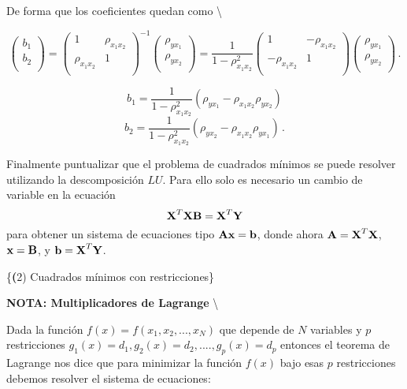 \documentclass[
]{agujournal2019}
\begin{document}
De forma que los coeficientes quedan como \textbackslash{}

\[\left(\begin{array}{c}
  b_1 \\
  b_2 \\
        \end{array}\right)=\left(\begin{array}{cc}
  1 & \rho_{x_{1} x_{2}} \\
  \rho_{x_{1} x_{2}} & 1 \\
        \end{array}\right)^{-1}
     \left(\begin{array}{c}
  \rho_{y x_{1}} \\
  \rho_{y x_{2}} \\
        \end{array}\right)=\frac{1}{1-\rho^2_{x_{1} x_{2}}}
    \left(\begin{array}{cc}
  1 & -\rho_{x_{1} x_{2}} \\
  -\rho_{x_{1} x_{2}} & 1 \\
        \end{array}\right)\left(\begin{array}{c}
  \rho_{y x_{1}} \\
  \rho_{y x_{2}} \\
  \end{array}\right)\,.\]

\[b_1=\frac{1}{1-\rho^2_{x_{1} x_{2}}}({\rho_{y x_{1}} - \rho_{x_{1} x_{2}} \rho_{y x_{2}}})\]
\[b_2=\frac{1}{1-\rho^2_{x_{1} x_{2}}}({\rho_{y x_{2}} - \rho_{x_{1} x_{2}} \rho_{y x_{1}}})\,.\]

\noindent Finalmente puntualizar que el problema de cuadrados mínimos se
puede resolver utilizando la descomposición \(LU\). Para ello solo es
necesario un cambio de variable en la ecuación
\[{\textbf X}^T{\textbf X}{\textbf B}={\textbf X}^T{\textbf Y}\] para
obtener un sistema de ecuaciones tipo
\({\textbf A}{\textbf x}={\textbf b}\), donde ahora
\({\textbf A}={\textbf X}^T{\textbf X}\), \({\textbf x}={\textbf B}\), y
\({\textbf b}={\textbf X}^T{\textbf Y}\).

\vspace{0.5cm}

\{\noindent \textbf (2) Cuadrados mínimos con restricciones\}

\vspace{0.5cm}

\textbf {\noindent NOTA: Multiplicadores de Lagrange} \textbackslash{}

\noindent Dada la función \(f(x)=f(x_1,x_2,...,x_N)\) que depende de
\(N\) variables y \(p\) restricciones
\(g_1(x)=d_1, g_2(x)=d_2,....,g_p(x)=d_p\) entonces el teorema de
Lagrange nos dice que para minimizar la función \(f(x)\) bajo esas \(p\)
restricciones debemos resolver el sistema de ecuaciones:
\end{document}
